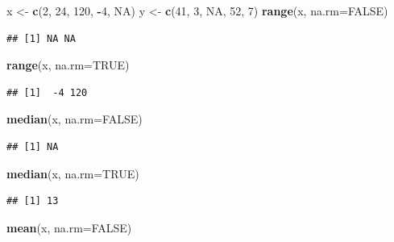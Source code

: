 \documentclass[
]{book}
\newenvironment{Shaded}{\begin{snugshade}}{\end{snugshade}}
\newcommand{\AttributeTok}[1]{\textcolor[rgb]{0.13,0.29,0.53}{#1}}
\newcommand{\ConstantTok}[1]{\textcolor[rgb]{0.56,0.35,0.01}{#1}}
\newcommand{\DecValTok}[1]{\textcolor[rgb]{0.00,0.00,0.81}{#1}}
\newcommand{\FunctionTok}[1]{\textcolor[rgb]{0.13,0.29,0.53}{\textbf{#1}}}
\newcommand{\NormalTok}[1]{#1}
\newcommand{\OtherTok}[1]{\textcolor[rgb]{0.56,0.35,0.01}{#1}}
\newcommand{\SpecialCharTok}[1]{\textcolor[rgb]{0.81,0.36,0.00}{\textbf{#1}}}
\begin{document}
\begin{Shaded}
\begin{Highlighting}[]
\NormalTok{x }\OtherTok{\textless{}{-}} \FunctionTok{c}\NormalTok{(}\DecValTok{2}\NormalTok{, }\DecValTok{24}\NormalTok{, }\DecValTok{120}\NormalTok{, }\SpecialCharTok{{-}}\DecValTok{4}\NormalTok{, }\ConstantTok{NA}\NormalTok{)}
\NormalTok{y }\OtherTok{\textless{}{-}} \FunctionTok{c}\NormalTok{(}\DecValTok{41}\NormalTok{, }\DecValTok{3}\NormalTok{, }\ConstantTok{NA}\NormalTok{, }\DecValTok{52}\NormalTok{, }\DecValTok{7}\NormalTok{)}
\FunctionTok{range}\NormalTok{(x, }\AttributeTok{na.rm=}\ConstantTok{FALSE}\NormalTok{)}
\end{Highlighting}
\end{Shaded}

\begin{verbatim}
## [1] NA NA
\end{verbatim}

\begin{Shaded}
\begin{Highlighting}[]
\FunctionTok{range}\NormalTok{(x, }\AttributeTok{na.rm=}\ConstantTok{TRUE}\NormalTok{)}
\end{Highlighting}
\end{Shaded}

\begin{verbatim}
## [1]  -4 120
\end{verbatim}

\begin{Shaded}
\begin{Highlighting}[]
\FunctionTok{median}\NormalTok{(x, }\AttributeTok{na.rm=}\ConstantTok{FALSE}\NormalTok{)}
\end{Highlighting}
\end{Shaded}

\begin{verbatim}
## [1] NA
\end{verbatim}

\begin{Shaded}
\begin{Highlighting}[]
\FunctionTok{median}\NormalTok{(x, }\AttributeTok{na.rm=}\ConstantTok{TRUE}\NormalTok{)}
\end{Highlighting}
\end{Shaded}

\begin{verbatim}
## [1] 13
\end{verbatim}

\begin{Shaded}
\begin{Highlighting}[]
\FunctionTok{mean}\NormalTok{(x, }\AttributeTok{na.rm=}\ConstantTok{FALSE}\NormalTok{)}
\end{Highlighting}
\end{Shaded}
\end{document}
